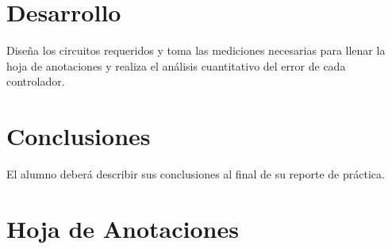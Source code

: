 
\section{Desarrollo}

	Diseña los circuitos requeridos y toma las mediciones necesarias para llenar la hoja de anotaciones y realiza el análisis cuantitativo del error de cada controlador.


\section{Conclusiones}
	El alumno deberá describir sus conclusiones al final de su reporte de práctica.


\clearpage
\section{Hoja de Anotaciones}

